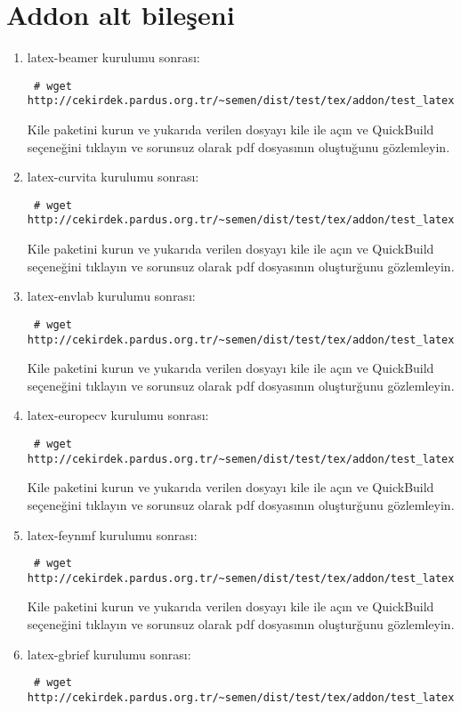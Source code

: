 \documentclass[a4paper,10pt]{article}
\begin{document}
\section{Addon alt bileşeni}
\begin{enumerate}
\item  latex-beamer kurulumu sonrası:
\begin{verbatim}
 # wget http://cekirdek.pardus.org.tr/~semen/dist/test/tex/addon/test_latexbeamer.tex
\end{verbatim}

Kile paketini kurun ve yukarıda verilen dosyayı kile ile açın ve QuickBuild  seçeneğini tıklayın ve sorunsuz olarak pdf dosyasının oluştuğunu gözlemleyin.
\item  latex-curvita kurulumu sonrası:
\begin{verbatim}
 # wget http://cekirdek.pardus.org.tr/~semen/dist/test/tex/addon/test_latexcurrvita.tex
\end{verbatim}

Kile paketini kurun ve yukarıda verilen dosyayı kile ile açın ve QuickBuild  seçeneğini tıklayın ve sorunsuz olarak pdf dosyasının oluşturğunu gözlemleyin.
\item  latex-envlab kurulumu sonrası:
\begin{verbatim}
 # wget http://cekirdek.pardus.org.tr/~semen/dist/test/tex/addon/test_latexenvlab.tex
\end{verbatim}

Kile paketini kurun ve yukarıda verilen dosyayı kile ile açın ve QuickBuild  seçeneğini tıklayın ve sorunsuz olarak pdf dosyasının oluşturğunu gözlemleyin.
\item  latex-europecv kurulumu sonrası:
\begin{verbatim}
 # wget http://cekirdek.pardus.org.tr/~semen/dist/test/tex/addon/test_latexeuropecv.tex
\end{verbatim}

Kile paketini kurun ve yukarıda verilen dosyayı kile ile açın ve QuickBuild  seçeneğini tıklayın ve sorunsuz olarak pdf dosyasının oluşturğunu gözlemleyin.
\item  latex-feynmf kurulumu sonrası:
\begin{verbatim}
 # wget http://cekirdek.pardus.org.tr/~semen/dist/test/tex/addon/test_latexfeynmf.tex
\end{verbatim}

Kile paketini kurun ve yukarıda verilen dosyayı kile ile açın ve QuickBuild  seçeneğini tıklayın ve sorunsuz olarak pdf dosyasının oluşturğunu gözlemleyin.
\item  latex-gbrief kurulumu sonrası:
\begin{verbatim}
 # wget http://cekirdek.pardus.org.tr/~semen/dist/test/tex/addon/test_latexgbrief.tex
\end{verbatim}


\end{enumerate}
\end{document}

